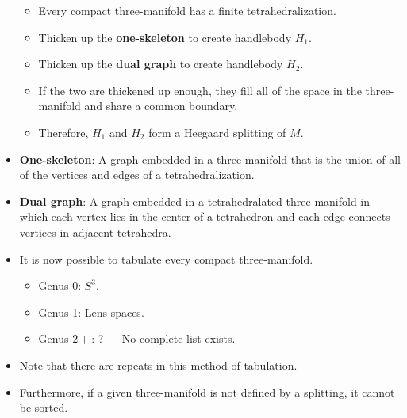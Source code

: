 \documentclass[titlepage]{article}
\numberwithin{figure}{section}
\numberwithin{table}{section}
\numberwithin{equation}{section}
\begin{document}
\begin{itemize}
\begin{itemize}
        \item Every compact three-manifold has a finite tetrahedralization.
        \item Thicken up the \textbf{one-skeleton} to create handlebody $H_1$.
        \item Thicken up the \textbf{dual graph} to create handlebody $H_2$.
        \item If the two are thickened up enough, they fill all of the space in the three-manifold  and share a common boundary.
        \item Therefore, $H_1$ and $H_2$ form a Heegaard splitting of $M$.
    \end{itemize}
    \item \textbf{One-skeleton}: A graph embedded in a three-manifold that is the union of all of the vertices and edges of a tetrahedralization.
    \item \textbf{Dual graph}: A graph embedded in a tetrahedralated three-manifold in which each vertex lies in the center of a tetrahedron and each edge connects vertices in adjacent tetrahedra.
    \item It is now possible to tabulate every compact three-manifold.
    \begin{itemize}
        \item Genus 0: $S^3$.
        \item Genus 1: Lens spaces.
        \item Genus $2+$: ? --- No complete list exists.
    \end{itemize}
    \item Note that there are repeats in this method of tabulation.
    \item Furthermore, if a given three-manifold is not defined by a splitting, it cannot be sorted.
\end{itemize}
\end{document}
